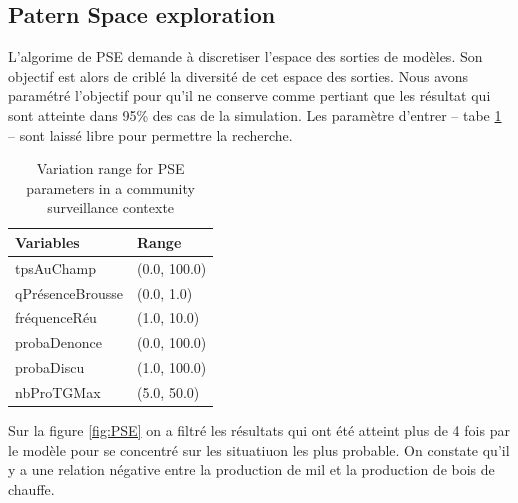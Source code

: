 \documentclass{article}
\begin{document}
    \subsection{Patern Space exploration}

    L'algorime de PSE demande à discretiser l'espace des sorties de modèles. Son objectif est alors de criblé la diversité de cet espace des sorties. Nous avons paramétré l'objectif pour qu'il ne conserve comme pertiant que les résultat qui sont atteinte dans 95\% des cas de la simulation. Les paramètre d'entrer -- tabe \ref{tab:PSEparamsPop} -- sont laissé libre pour permettre la recherche.\\
    
    \begin{table}
        \centering\begingroup\fontsize{10}{12}\selectfont
            \begin{tabular}[]{ll}
                    \toprule
                    Variables & Range\\
                    \hline
                    \addlinespace
                    tpsAuChamp & (0.0, 100.0)\\
                    qPrésenceBrousse & (0.0, 1.0)\\
                    fréquenceRéu & (1.0, 10.0)\\
                    probaDenonce & (0.0, 100.0)\\
                    probaDiscu & (1.0, 100.0)\\
                    nbProTGMax & (5.0, 50.0)\\
                    \bottomrule
            \end{tabular}
            \caption{Variation range for PSE parameters in a community surveillance contexte}
            \label{tab:PSEparamsPop}
        \endgroup{}
    \end{table}

    Sur la figure \ref{fig:PSE} on a filtré les résultats qui ont été atteint plus de 4 fois par le modèle pour se concentré sur les situatiuon les plus probable. On constate qu'il y a une relation négative entre la production de mil et la production de bois de chauffe. 
\end{document}
